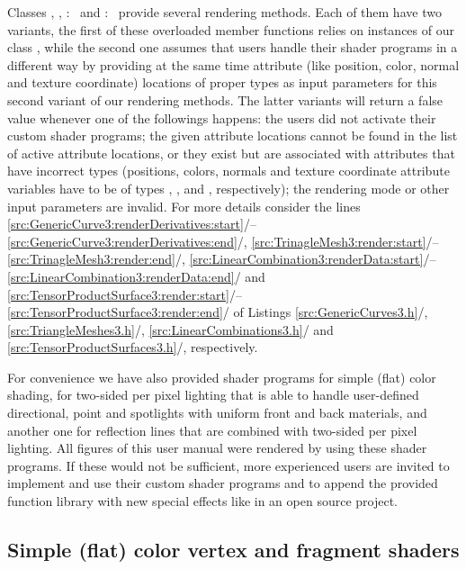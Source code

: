 \documentclass[b5paper, twosided]{book}
\newcommand{\CRed}[1]{{\color[rgb]{0.5, 0.0, 0.0}{#1}}}
\newcommand{\CBlue}[1]{{\color[rgb]{0.0, 0.0, 0.9}{#1}}}
\DeclareRobustCommand{\mref}[1]{\ref{#1}{\relsize{-1}/\pageref{#1}}}
\begin{document}
Classes \CBlue{GenericCurve3}, \CBlue{TriangleMesh3}, \CBlue{BCurve3}:\ \CRed{public} \CBlue{LinearCombination3} and \CBlue{BSurface3}:\ \CRed{public} \CBlue{TensorProductSurface3} provide several rendering methods. Each of them have two variants, the first of these overloaded member functions relies on instances of our class \CBlue{ShaderProgram}, while the second one assumes that users handle their shader programs in a different way by providing at the same time attribute (like position, color, normal and texture coordinate) locations of proper types as input parameters for this second variant of our rendering methods. The latter variants will return a false value whenever one of the followings happens: the users did not activate their custom shader programs; the given attribute locations cannot be found in the list of active attribute locations, or they exist but are associated with attributes that have incorrect types (positions, colors, normals and texture coordinate attribute variables have to be of types \CRed{vec3}, \CRed{vec4}, \CRed{vec3} and \CRed{vec4}, respectively); the rendering mode or other input parameters are invalid. For more details consider the lines \mref{src:GenericCurve3:renderDerivatives:start}--\mref{src:GenericCurve3:renderDerivatives:end}, \mref{src:TrinagleMesh3:render:start}--\mref{src:TrinagleMesh3:render:end},  \mref{src:LinearCombination3:renderData:start}--\mref{src:LinearCombination3:renderData:end} and \mref{src:TensorProductSurface3:render:start}--\mref{src:TensorProductSurface3:render:end} of Listings \mref{src:GenericCurves3.h}, \mref{src:TriangleMeshes3.h},  \mref{src:LinearCombinations3.h} and \mref{src:TensorProductSurfaces3.h}, respectively.

For convenience we have also provided shader programs for simple (flat) color shading, for two-sided per pixel lighting that is able to handle user-defined directional, point and spotlights with uniform front and back materials, and another one for reflection lines that are combined with two-sided per pixel lighting. All figures of this user manual were rendered by using these shader programs. If these would not be sufficient, more experienced users are invited to implement and use their custom shader programs and to append the provided function library with new special effects like in an open source project.

\subsection{Simple (flat) color vertex and fragment shaders}
\end{document}
